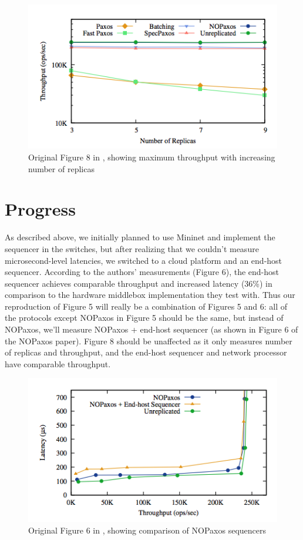 \begin{figure}[tp]
\centering
\includegraphics[scale=0.5]{figures/figure_8.png}
\caption{Original Figure 8 in \cite{nopaxos}, showing maximum throughput with increasing number of replicas}
\end{figure}


\section{Progress}

As described above, we initially planned to use Mininet and implement the sequencer in the switches, but after realizing that we couldn't measure microsecond-level latencies, we switched to a cloud platform and an end-host sequencer. According to the authors' measurements (Figure 6), the end-host sequencer achieves comparable throughput and increased latency (36\%) in comparison to the hardware middlebox implementation they test with. Thus our reproduction of Figure 5 will really be a combination of Figures 5 and 6: all of the protocols except NOPaxos in Figure 5 should be the same, but instead of NOPaxos, we'll measure NOPaxos + end-host sequencer (as shown in Figure 6 of the NOPaxos paper). Figure 8 should be unaffected as it only measures number of replicas and throughput, and the end-host sequencer and network processor have comparable throughput. 

\begin{figure}[tp]
\centering
\includegraphics[scale=0.5]{figures/figure_6.png}
\caption{Original Figure 6 in \cite{nopaxos}, showing comparison of NOPaxos sequencers}
\end{figure}

